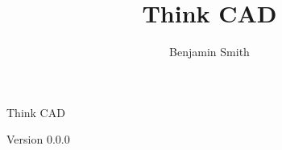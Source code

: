 \documentclass[12pt]{book}
\theoremstyle{exercise}
\begin{document}
\newcommand{\thetitle}{Think CAD}
\newcommand{\thesubtitle}{TBD}
\newcommand{\theauthors}{Benjamin Smith}
\newcommand{\theversion}{0.0.0}
\newcommand*\keystroke[1]{%
  \tikz[baseline=(key.base)]
    \node[%
      draw,
      fill=white,
      drop shadow={shadow xshift=0.25ex,shadow yshift=-0.25ex,fill=black,opacity=0.75},
      rectangle,
      rounded corners=2pt,
      inner sep=1pt,
      line width=0.5pt,
      font=\scriptsize\sffamily
    ](key) {#1\strut}
  ;
}
\title{\thetitle}
\author{\theauthors}



\thispagestyle{empty}

\begin{flushright}
\vspace*{2.0in}

\begin{spacing}{3}
{\huge \thetitle}
\end{spacing}

\vspace{0.25in}

Version \theversion

\vfill

\end{flushright}




\end{document}
